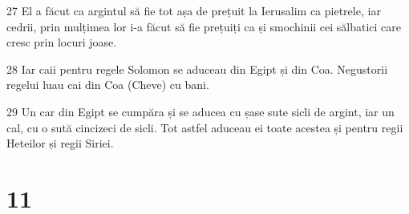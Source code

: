 \par 27 El a făcut ca argintul să fie tot așa de prețuit la Ierusalim ca pietrele, iar cedrii, prin mulțimea lor i-a făcut să fie prețuiți ca și smochinii cei sălbatici care cresc prin locuri joase.
\par 28 Iar caii pentru regele Solomon se aduceau din Egipt și din Coa. Negustorii regelui luau cai din Coa (Cheve) cu bani.
\par 29 Un car din Egipt se cumpăra și se aducea cu șase sute sicli de argint, iar un cal, cu o sută cincizeci de sicli. Tot astfel aduceau ei toate acestea și pentru regii Heteilor și regii Siriei.

\chapter{11}

